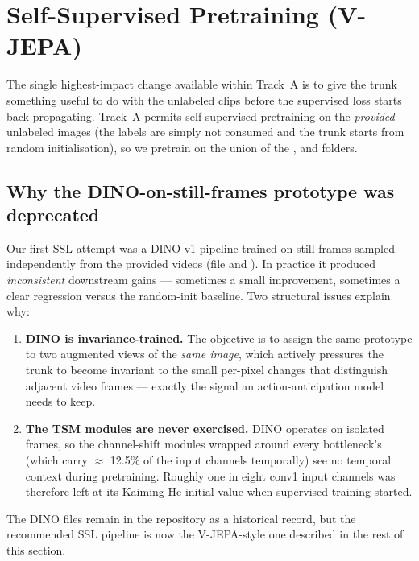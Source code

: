 \section{Self-Supervised Pretraining (V-JEPA)}
\label{sec:phase3}

The single highest-impact change available within Track~A is to give the
trunk something useful to do with the unlabeled clips before the
supervised loss starts back-propagating. Track~A permits self-supervised
pretraining on the \emph{provided} unlabeled images (the labels are
simply not consumed and the trunk starts from random initialisation), so
we pretrain on the union of the ,  and
 folders.

\subsection{Why the DINO-on-still-frames prototype was deprecated}
\label{sec:phase3:dino-deprecated}

Our first SSL attempt was a DINO-v1 \cite{Caron2021DINO} pipeline trained
on still frames sampled independently from the provided videos (file
 and
). In practice it produced
\emph{inconsistent} downstream gains --- sometimes a small improvement,
sometimes a clear regression versus the random-init baseline. Two
structural issues explain why:

\begin{enumerate}[leftmargin=*]
\item \textbf{DINO is invariance-trained.} The objective is to assign
   the same prototype to two augmented views of the \emph{same image},
   which actively pressures the trunk to become invariant to the small
   per-pixel changes that distinguish adjacent video frames --- exactly
   the signal an action-anticipation model needs to keep.
\item \textbf{The TSM modules are never exercised.} DINO operates on
   isolated frames, so the channel-shift modules wrapped around every
   bottleneck's  (which carry $\approx$ 12.5\% of the
   input channels temporally) see no temporal context during
   pretraining. Roughly one in eight conv1 input channels was therefore
   left at its Kaiming He initial value when supervised training
   started.
\end{enumerate}

The DINO files remain in the repository as a historical record, but the
recommended SSL pipeline is now the V-JEPA-style one described in the
rest of this section.

